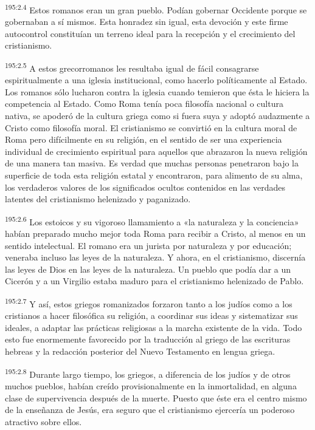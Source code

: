 \par 
\textsuperscript{195:2.4} Estos romanos eran un gran pueblo. Podían gobernar Occidente porque se gobernaban a sí mismos. Esta honradez sin igual, esta devoción y este firme autocontrol constituían un terreno ideal para la recepción y el crecimiento del cristianismo.

\par 
\textsuperscript{195:2.5} A estos grecorromanos les resultaba igual de fácil consagrarse espiritualmente a una iglesia institucional, como hacerlo políticamente al Estado. Los romanos sólo lucharon contra la iglesia cuando temieron que ésta le hiciera la competencia al Estado. Como Roma tenía poca filosofía nacional o cultura nativa, se apoderó de la cultura griega como si fuera suya y adoptó audazmente a Cristo como filosofía moral. El cristianismo se convirtió en la cultura moral de Roma pero difícilmente en su religión, en el sentido de ser una experiencia individual de crecimiento espiritual para aquellos que abrazaron la nueva religión de una manera tan masiva. Es verdad que muchas personas penetraron bajo la superficie de toda esta religión estatal y encontraron, para alimento de su alma, los verdaderos valores de los significados ocultos contenidos en las verdades latentes del cristianismo helenizado y paganizado.

\par 
\textsuperscript{195:2.6} Los estoicos y su vigoroso llamamiento a «la naturaleza y la conciencia» habían preparado mucho mejor toda Roma para recibir a Cristo, al menos en un sentido intelectual. El romano era un jurista por naturaleza y por educación; veneraba incluso las leyes de la naturaleza. Y ahora, en el cristianismo, discernía las leyes de Dios en las leyes de la naturaleza. Un pueblo que podía dar a un Cicerón y a un Virgilio estaba maduro para el cristianismo helenizado de Pablo.

\par 
\textsuperscript{195:2.7} Y así, estos griegos romanizados forzaron tanto a los judíos como a los cristianos a hacer filosófica su religión, a coordinar sus ideas y sistematizar sus ideales, a adaptar las prácticas religiosas a la marcha existente de la vida. Todo esto fue enormemente favorecido por la traducción al griego de las escrituras hebreas y la redacción posterior del Nuevo Testamento en lengua griega.

\par 
\textsuperscript{195:2.8} Durante largo tiempo, los griegos, a diferencia de los judíos y de otros muchos pueblos, habían creído provisionalmente en la inmortalidad, en alguna clase de supervivencia después de la muerte. Puesto que éste era el centro mismo de la enseñanza de Jesús, era seguro que el cristianismo ejercería un poderoso atractivo sobre ellos.


